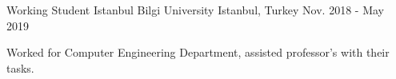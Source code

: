 \begin{cventries}

\cventry
{Working Student} %
{Istanbul Bilgi University} %
{Istanbul, Turkey} %
{Nov. 2018 - May 2019} %
{ %
\begin{cvitems}
\item {Worked for Computer Engineering Department, assisted professor's with their tasks.}
\end{cvitems}
}

\end{cventries}